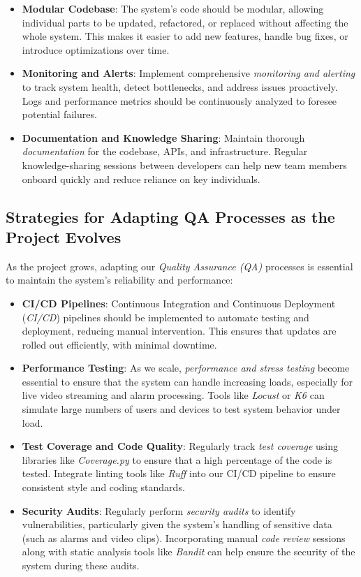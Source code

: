 \documentclass{article}
\begin{document}
\begin{itemize}
    \item \textbf{Modular Codebase}: The system’s code should be modular, allowing individual parts to be updated, refactored, or replaced without affecting the whole system. This makes it easier to add new features, handle bug fixes, or introduce optimizations over time.
    \item \textbf{Monitoring and Alerts}: Implement comprehensive \textit{monitoring and alerting} to track system health, detect bottlenecks, and address issues proactively. Logs and performance metrics should be continuously analyzed to foresee potential failures.
    \item \textbf{Documentation and Knowledge Sharing}: Maintain thorough \textit{documentation} for the codebase, APIs, and infrastructure. Regular knowledge-sharing sessions between developers can help new team members onboard quickly and reduce reliance on key individuals.
\end{itemize}

\subsection{Strategies for Adapting QA Processes as the Project Evolves}

As the project grows, adapting our \textit{Quality Assurance (QA)} processes is essential to maintain the system’s reliability and performance:

\begin{itemize}
    \item \textbf{CI/CD Pipelines}: Continuous Integration and Continuous Deployment (\textit{CI/CD}) pipelines should be implemented to automate testing and deployment, reducing manual intervention. This ensures that updates are rolled out efficiently, with minimal downtime.
    \item \textbf{Performance Testing}: As we scale, \textit{performance and stress testing} become essential to ensure that the system can handle increasing loads, especially for live video streaming and alarm processing. Tools like \textit{Locust} or \textit{K6} can simulate large numbers of users and devices to test system behavior under load.
    \item \textbf{Test Coverage and Code Quality}: Regularly track \textit{test coverage} using libraries like \textit{Coverage.py} to ensure that a high percentage of the code is tested. Integrate linting tools like \textit{Ruff} into our CI/CD pipeline to ensure consistent style and coding standards.
    \item \textbf{Security Audits}: Regularly perform \textit{security audits} to identify vulnerabilities, particularly given the system's handling of sensitive data (such as alarms and video clips). Incorporating manual \textit{code review} sessions along with static analysis tools like \textit{Bandit} can help ensure the security of the system during these audits.
\end{itemize}
\end{document}
